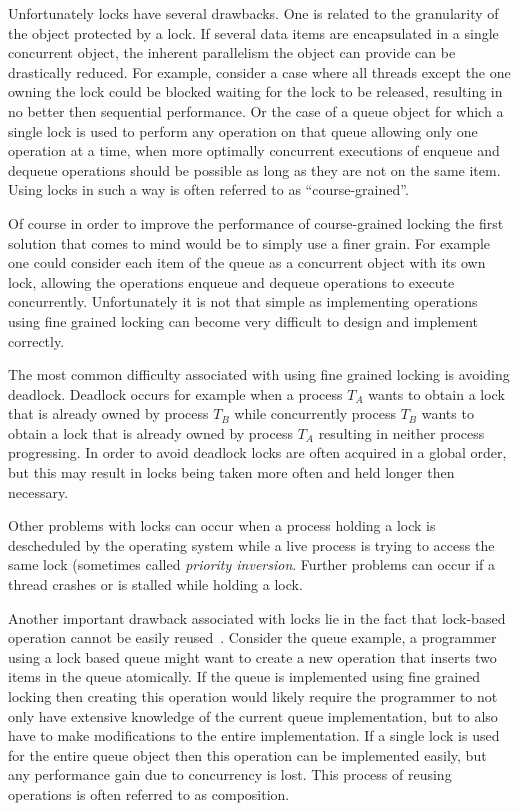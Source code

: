 Unfortunately locks have several drawbacks. One is related to the  granularity
of the object protected by a lock. If several data items 
are encapsulated  in a single  concurrent  object, the
inherent parallelism  the object can provide 
can be drastically reduced.
For example, consider a case where all threads except the one owning the lock could be blocked waiting
for the lock to be released, resulting in no better then sequential performance.
Or the case of a queue 
object for which a single lock is used to perform any operation on that queue
allowing only one operation at a time, when more optimally
concurrent executions of enqueue and dequeue operations 
should be possible as long as they are not on the same item.
Using locks in such a way is often referred to as ``course-grained''.


Of course in order to improve the performance of course-grained locking
the first solution that comes to mind would be to simply
use a finer grain.  For example one could consider
each item of the queue as  a concurrent object with its own lock,
allowing the  operations  enqueue  
and  dequeue  operations to execute concurrently.
Unfortunately it is not that simple as implementing operations using
fine grained locking can  become very   difficult  to  design and implement
correctly.

The most common difficulty associated with using fine grained locking
is avoiding deadlock.
Deadlock occurs for example when a process $T_A$ wants to obtain a lock that
is already owned by process $T_B$ while concurrently process $T_B$ wants
to obtain a lock that is already owned by process $T_A$ resulting
in neither process progressing.
In order to avoid deadlock locks are often acquired in a global order,
but this may result in locks being taken more often and held longer then necessary.

Other problems with locks can occur when a process holding a lock
is descheduled by the operating system while a live process is trying to
access the same lock (sometimes called \emph{priority inversion}.
Further problems can occur if a thread crashes or is stalled while
holding a lock.

Another important drawback associated with locks lie in the fact that 
lock-based operation cannot be easily reused~\cite{HMPH05,GG11}.
Consider the queue example, a programmer using a lock based queue
might want to create a new operation that inserts two items in the queue
atomically.
If the queue is implemented using fine grained locking then creating this operation
would likely require the programmer to not only have extensive knowledge of the current
queue implementation, but to also have to make modifications to the entire implementation.
If a single lock is used for the entire queue object then this operation can be implemented
easily, but any performance gain due to concurrency is lost.
This process of reusing operations is often referred to as composition.


